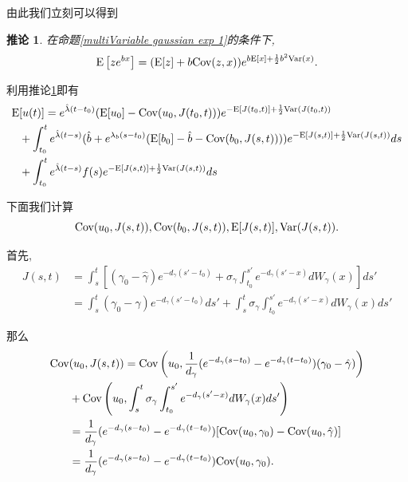 \documentclass[notitlepage,cs4size,punct,oneside]{ctexrep}
\numberwithin{equation}{section}
\theoremstyle{mystyle}
\newtheorem{corollary}[definition]{\hspace{2em}推论}
\begin{document}
由此我们立刻可以得到
\begin{corollary} \label{multiVariable gaussian exp 2} 在命题\ref{multiVariable gaussian exp 1}的条件下,
$$\text{E}\left[ze^{bx}\right] = (\text{E}[z]+b\text{Cov}(z, x))e^{b\text{E}[x]+\frac{1}{2}b^2\text{Var}(x)}.$$
\end{corollary}

利用推论\ref{multiVariable gaussian exp 2}即有
\begin{equation} \label{E u(t)}
\begin{split}
\text{E}&[u(t)] = e^{\hat{\lambda}(t-t_0)}(\text{E}[u_0]-\text{Cov}(u_0, J(t_0, t)))e^{-\text{E}[J(t_0, t)]+\frac{1}{2}\text{Var}(J(t_0, t))} \\
&+ \int_{t_0}^t e^{\hat{\lambda}(t-s)}(\hat{b}+e^{\lambda_b(s-t_0)}(\text{E}[b_0]-\hat{b}-\text{Cov}(b_0, J(s, t))))e^{-\text{E}[J(s, t)]+\frac{1}{2}\text{Var}(J(s, t))}ds \\
&+ \int_{t_0}^t e^{\hat{\lambda}(t-s)}f(s)e^{-\text{E}[J(s, t)]+\frac{1}{2}\text{Var}(J(s, t))}ds
\end{split}
\end{equation}

下面我们计算
$$\text{Cov}(u_0, J(s, t)), \text{Cov}(b_0, J(s, t)), \text{E}[J(s, t)], \text{Var}(J(s, t)).$$

首先,
\begin{equation} \label{J(s, t) all}
\begin{split}
J(s, t) &= \int_s^t \left[(\gamma_0-\hat{\gamma})e^{-d_\gamma(s'-t_0)}+\sigma_\gamma\int_{t_0}^{s'}e^{-d_\gamma(s'-x)}dW_\gamma(x)\right]ds' \\
& = \int_s^t(\gamma_0-\hat{\gamma})e^{-d_\gamma(s'-t_0)}ds' +\int_s^t \sigma_\gamma\int_{t_0}^{s'} e^{-d_\gamma(s'-x)}dW_\gamma(x)ds'
\end{split}
\end{equation}

那么
\begin{equation} \label{Cov u0 J(s, t)}
\begin{split}
\text{Cov}&(u_0, J(s, t)) = \text{Cov}\left(u_0, \frac{1}{d_\gamma}(e^{-d_\gamma(s-t_0)}-e^{-d_\gamma(t-t_0)})(\gamma_0 - \hat{\gamma})\right) \\
&+ \text{Cov}\left(u_0, \int_s^t \sigma_\gamma \int_{t_0}^{s'} e^{-d_\gamma(s'-x)} dW_\gamma(x)ds'\right)\\
&= \frac{1}{d_\gamma}(e^{-d_\gamma(s-t_0)}-e^{-d_\gamma(t-t_0)})[\text{Cov}(u_0, \gamma_0)-\text{Cov}(u_0, \hat{\gamma})] \\
&= \frac{1}{d_\gamma}(e^{-d_\gamma(s-t_0)}-e^{-d_\gamma(t-t_0)})\text{Cov}(u_0, \gamma_0).
\end{split}
\end{equation}
\end{document}
